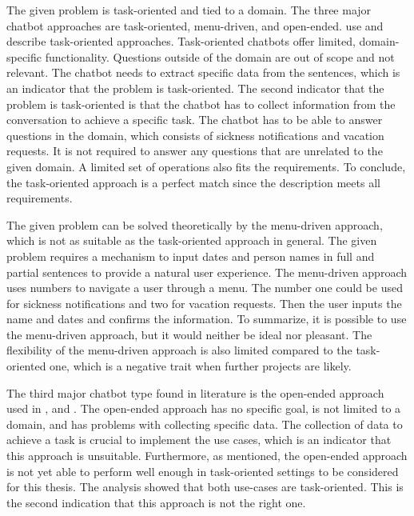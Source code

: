 The given problem is task-oriented and tied to a domain.
The three major chatbot approaches are task-oriented, menu-driven, and open-ended. 
\citet{deshpande2017survey, luis2015williams, braunEvaluatingNLU, williams2017hybrid} use and describe task-oriented approaches.
Task-oriented chatbots offer limited, domain-specific functionality. 
Questions outside of the domain are out of scope and not relevant.
The chatbot needs to extract specific data from the sentences, which is an indicator that the problem is task-oriented.
The second indicator that the problem is task-oriented is that the chatbot has to collect information from the conversation to achieve a specific task.
The chatbot has to be able to answer questions in the domain, which consists of sickness notifications and vacation requests.
It is not required to answer any questions that are unrelated to the given domain.
A limited set of operations also fits the requirements.
To conclude, the task-oriented approach is a perfect match since the description meets all requirements.

The given problem can be solved theoretically by the menu-driven approach, which is not as suitable as the task-oriented approach in general.
The given problem requires a mechanism to input dates and person names in full and partial sentences to provide a natural user experience.
The menu-driven approach uses numbers to navigate a user through a menu.
The number one could be used for sickness notifications and two for vacation requests. 
Then the user inputs the name and dates and confirms the information.
To summarize, it is possible to use the menu-driven approach, but it would neither be ideal nor pleasant.
The flexibility of the menu-driven approach is also limited compared to the task-oriented one, which is a negative trait when further projects are likely.

The third major chatbot type found in literature is the open-ended approach used in \citet{williams2017hybrid, bordes2016learning}, and \citet{rahman2017programming}.
The open-ended approach has no specific goal, is not limited to a domain, and has problems with collecting specific data.
The collection of data to achieve a task is crucial to implement the use cases, which is an indicator that this approach is unsuitable.
Furthermore, as \citet{bordes2016learning} mentioned, the open-ended approach is not yet able to perform well enough in task-oriented settings to be considered for this thesis.
The analysis showed that both use-cases are task-oriented.
This is the second indication that this approach is not the right one.

